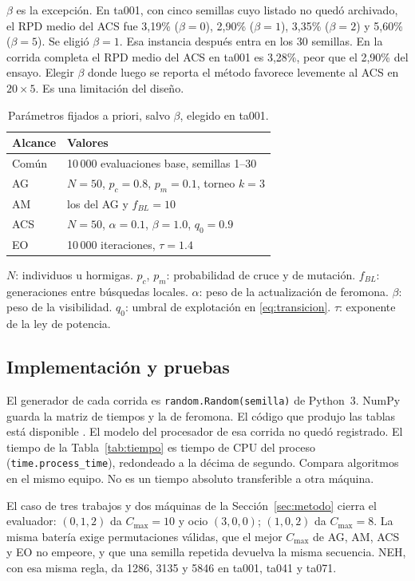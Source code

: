 \documentclass[journal]{IEEEtran}
\newcounter{lin}\newcommand{\li}{\stepcounter{lin}\thelin:\ }
\newcommand{\notatabla}[1]{\par\vspace{4pt}\colorbox{gray!12}{\parbox{\dimexpr\linewidth-2\fboxsep\relax}{\footnotesize\raggedright #1}}}
\begin{document}
$\beta$ es la excepción. En ta001, con cinco semillas cuyo listado no quedó archivado, el RPD medio del ACS fue 3,19\% ($\beta=0$), 2,90\% ($\beta=1$), 3,35\% ($\beta=2$) y 5,60\% ($\beta=5$). Se eligió $\beta=1$. Esa instancia después entra en los 30 semillas. En la corrida completa el RPD medio del ACS en ta001 es 3,28\%, peor que el 2,90\% del ensayo. Elegir $\beta$ donde luego se reporta el método favorece levemente al ACS en $20\times5$. Es una limitación del diseño.

\begin{table}[!t]
  \caption{Parámetros fijados a priori, salvo $\beta$, elegido en ta001.}\label{tab:parametros}
  \centering\footnotesize
  \begin{tabular}{l l}\hline
    Alcance & Valores\\ \hline
    Común & 10\,000 evaluaciones base, semillas 1--30\\
    AG & $N=50$, $p_c=0.8$, $p_m=0.1$, torneo $k=3$\\
    AM & los del AG y $f_{BL}=10$\\
    ACS & $N=50$, $\alpha=0.1$, $\beta=1.0$, $q_0=0.9$\\
    EO & 10\,000 iteraciones, $\tau=1.4$\\ \hline
  \end{tabular}
  \notatabla{$N$: individuos u hormigas. $p_c$, $p_m$: probabilidad de cruce y de mutación. $f_{BL}$: generaciones entre búsquedas locales. $\alpha$: peso de la actualización de feromona. $\beta$: peso de la visibilidad. $q_0$: umbral de explotación en \eqref{eq:transicion}. $\tau$: exponente de la ley de potencia.}
\end{table}

\subsection{Implementación y pruebas}
El generador de cada corrida es \texttt{random.Random(semilla)} de Python~3. NumPy guarda la matriz de tiempos y la de feromona. El código que produjo las tablas está disponible \cite{codigo_comparacion_2026}. El modelo del procesador de esa corrida no quedó registrado. El tiempo de la Tabla~\ref{tab:tiempo} es tiempo de CPU del proceso (\texttt{time.process\_time}), redondeado a la décima de segundo. Compara algoritmos en el mismo equipo. No es un tiempo absoluto transferible a otra máquina.

El caso de tres trabajos y dos máquinas de la Sección~\ref{sec:metodo} cierra el evaluador: $(0,1,2)$ da $C_{\max}=10$ y ocio $(3,0,0)$; $(1,0,2)$ da $C_{\max}=8$. La misma batería exige permutaciones válidas, que el mejor $C_{\max}$ de AG, AM, ACS y EO no empeore, y que una semilla repetida devuelva la misma secuencia. NEH, con esa misma regla, da 1286, 3135 y 5846 en ta001, ta041 y ta071.
\end{document}

